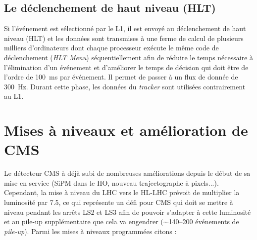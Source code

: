 \subsection{Le déclenchement de haut niveau (HLT)}
Si l'événement est sélectionné par le L1, il est envoyé au déclenchement de haut niveau (HLT) et les données sont transmises à une ferme de calcul de plusieurs milliers d'ordinateurs  dont chaque processeur exécute le même code de déclenchement (\textit{HLT Menu}) séquentiellement afin de réduire le temps nécessaire à l'élimination d'un événement et d'améliorer le temps de décision qui doit être de l'ordre de \SI{100}{\milli\second} par événement. Il permet de passer à un flux de donnée de \SI{300}{\hertz}. Durant cette phase, les données du \textit{tracker} sont utilisées contrairement au L1.

\section{Mises à niveaux et amélioration de CMS}
Le détecteur CMS à déjà subi de nombreuses améliorations depuis le début de sa mise en service (SiPM dans le HO, nouveau trajectographe à pixels...). Cependant, la mise à niveau du LHC vers le HL-LHC prévoit de multiplier la luminosité par \num{7.5}, ce qui représente un défi pour CMS qui doit se mettre à niveau pendant les arrêts LS2 et LS3 afin de pouvoir s'adapter à cette luminosité et au pile-up supplémentaire que cela va engendrer ($\sim$\num{140}--\num{200} événements de \textit{pile-up}). Parmi les mises à niveaux programmées citons \cite{Collaboration:1355706} \cite{Contardo:2020886} :
